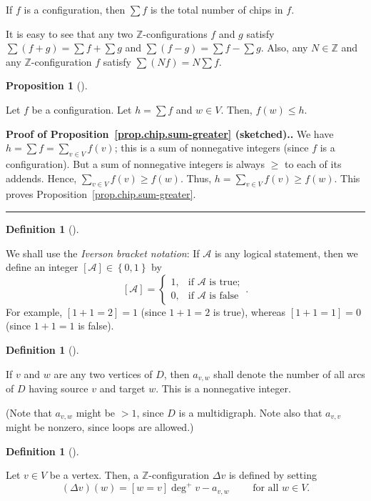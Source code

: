 \documentclass[numbers=enddot,12pt,final,onecolumn,notitlepage]{scrartcl}%
\theoremstyle{definition}
\newtheorem{prop}[theo]{Proposition}
\newenvironment{proposition}[1][]
{\begin{prop}[#1]\begin{leftbar}}
{\end{leftbar}\end{prop}}
\newtheorem{defi}[theo]{Definition}
\newenvironment{definition}[1][]
{\begin{defi}[#1]\begin{leftbar}}
{\end{leftbar}\end{defi}}
\newenvironment{proof}[1][Proof]{\noindent\textbf{#1.} }{\ \rule{0.5em}{0.5em}}
\let\sumnonlimits\sum
\renewcommand{\sum}{\sumnonlimits\limits}
\newcommand{\ZZ}{\mathbb{Z}}
\newcommand{\set}[1]{\left\{ #1 \right\}}
\newcommand{\tup}[1]{\left( #1 \right)}
\newcommand{\ive}[1]{\left[ #1 \right]}
\begin{document}
If $f$ is a configuration, then $\sum f$ is the total
number of chips in $f$.

It is easy to see that any two $\ZZ$-configurations $f$ and
$g$ satisfy $\sum \tup{f+g} = \sum f + \sum g$ and
$\sum \tup{f-g} = \sum f - \sum g$.
Also, any $N \in \ZZ$ and any $\ZZ$-configuration $f$
satisfy $\sum \tup{Nf} = N \sum f$.

\begin{proposition} \label{prop.chip.sum-greater}
Let $f$ be a configuration.
Let $h = \sum f$ and $w \in V$.
Then, $f \tup{w} \leq h$.
\end{proposition}

\begin{proof}[Proof of Proposition~\ref{prop.chip.sum-greater} (sketched).]
We have $h = \sum f = \sum_{v \in V} f \tup{v}$;
this is a sum of nonnegative integers (since $f$ is a
configuration).
But a sum of nonnegative integers is always $\geq$ to
each of its addends.
Hence, $\sum_{v \in V} f \tup{v} \geq f \tup{w}$.
Thus, $h = \sum_{v \in V} f \tup{v} \geq f \tup{w}$.
This proves Proposition~\ref{prop.chip.sum-greater}.
\end{proof}

\begin{definition}
\label{def.iverson}
We shall use the \textit{Iverson bracket notation}:
If $\mathcal{A}$ is any logical statement, then we define
an integer $\ive{ \mathcal{A} } \in \set{0, 1}$ by
\[
\ive{ \mathcal{A} } =
\begin{cases}
1, & \text{if }\mathcal{A}\text{ is true};\\
0, & \text{if }\mathcal{A}\text{ is false}
\end{cases}
.
\]
For example, $\ive{1+1=2} =1$ (since $1+1=2$ is true), whereas
$\ive{1+1=1} =0$ (since $1+1=1$ is false).
\end{definition}

\begin{definition}
If $v$ and $w$ are any two vertices of $D$, then
$a_{v, w}$ shall denote the number of all arcs of $D$ having
source $v$ and target $w$.
This is a nonnegative integer.
\end{definition}
(Note that $a_{v, w}$ might be $> 1$, since $D$ is a multidigraph.
Note also that $a_{v, v}$ might be nonzero, since loops are
allowed.)

\begin{definition}
Let $v \in V$ be a vertex.
Then, a $\ZZ$-configuration $\Delta v$ is defined by setting
\[
 \tup{\Delta v} \tup{w}
 = \ive{w = v} \deg^+ v - a_{v, w}
  \qquad \text{ for all } w \in V .
\]
\end{definition}
\end{document}
